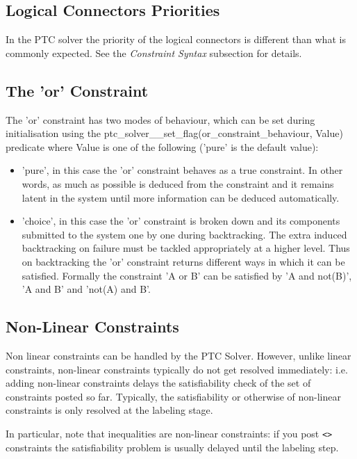 \documentclass{article}
\begin{document}
\subsection{Logical Connectors Priorities}

In the PTC solver the priority of the logical connectors is different than what
is commonly expected. See the \textit{Constraint Syntax} subsection for details.

\subsection{The 'or' Constraint}

The 'or' constraint has two modes of behaviour, which can be set during
initialisation using the \linebreak
ptc\_solver\_\_set\_flag(or\_constraint\_behaviour, Value)
predicate where Value is one of the following ('pure' is the default value):

\begin{itemize}
\item 'pure', in this case the 'or' constraint behaves as a true constraint. In other
words, as much as possible is deduced from the constraint and it
remains latent in the system until more information can be deduced
automatically.

\item 'choice', in this case the 'or' constraint is broken down and its components
submitted to the system one by one during backtracking. The extra
induced backtracking on failure must be tackled appropriately at a
higher level. Thus on backtracking the 'or' constraint returns
different ways in which it can be satisfied. Formally the
constraint 'A or B' can be satisfied by 'A and not(B)', 'A and B'
and 'not(A) and B'.
\end{itemize}

\subsection{Non-Linear Constraints}
Non linear constraints can be handled by the PTC Solver. However, unlike linear constraints, non-linear constraints typically do not get resolved immediately:
 i.e. adding non-linear constraints delays the satisfiability check of the set of constraints posted so far. Typically, the satisfiability or otherwise of non-linear constraints
 is only resolved at the labeling stage. 
 
In particular, note that inequalities are non-linear constraints: if you post \texttt{<>} constraints the satisfiability problem is usually delayed until the labeling step.   
\end{document}
